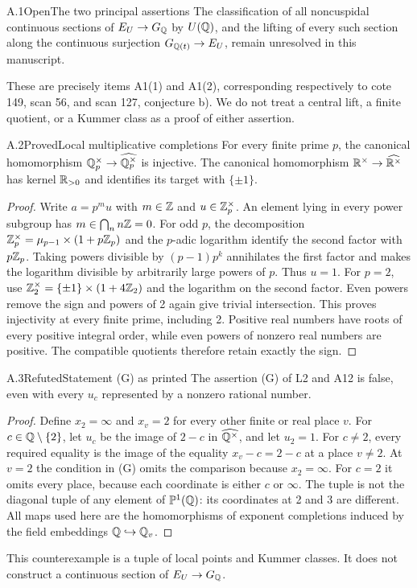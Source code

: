 \begin{statement}{A.1}{Open}{The two principal assertions}
The classification of all noncuspidal continuous sections of $E_U\to G_\mathbb Q$
by $U(\mathbb Q)$, and the lifting of every such section along the continuous
surjection $G_{\mathbb Q(t)}\to E_U$, remain unresolved in this manuscript.
\end{statement}
These are precisely items A1(1) and A1(2), corresponding respectively to
cote 149, scan 56, and scan 127, conjecture b). We do not treat a central
lift, a finite quotient, or a Kummer class as a proof of either assertion.

\begin{statement}{A.2}{Proved}{Local multiplicative completions}
For every finite prime $p$, the canonical homomorphism
$\mathbb Q_p^\times\to\widehat{\mathbb Q_p^\times}$ is injective.
The canonical homomorphism $\mathbb R^\times\to\widehat{\mathbb R^\times}$
has kernel $\mathbb R_{>0}$ and identifies its target with $\{\pm1\}$.
\end{statement}
\begin{proof}
Write $a=p^m u$ with $m\in\mathbb Z$ and $u\in\mathbb Z_p^\times$.
An element lying in every power subgroup has $m\in\bigcap_n n\mathbb Z=0$.
For odd $p$, the decomposition
$\mathbb Z_p^\times=\mu_{p-1}\times(1+p\mathbb Z_p)$ and the $p$-adic logarithm
identify the second factor with $p\mathbb Z_p$. Taking powers divisible by
$(p-1)p^k$ annihilates the first factor and makes the logarithm divisible
by arbitrarily large powers of $p$. Thus $u=1$.
For $p=2$, use $\mathbb Z_2^\times=\{\pm1\}\times(1+4\mathbb Z_2)$ and the
logarithm on the second factor. Even powers remove the sign and powers
of 2 again give trivial intersection. This proves injectivity at every
finite prime, including 2. Positive real numbers have roots of every
positive integral order, while even powers of nonzero real numbers are
positive. The compatible quotients therefore retain exactly the sign.
\end{proof}

\begin{statement}{A.3}{Refuted}{Statement (G) as printed}
The assertion (G) of L2 and A12 is false, even with every $u_c$ represented
by a nonzero rational number.
\end{statement}
\begin{proof}
Define $x_2=\infty$ and $x_v=2$ for every other finite or real place $v$.
For $c\in\mathbb Q\setminus\{2\}$, let $u_c$ be the image of $2-c$ in
$\widehat{\mathbb Q^\times}$, and let $u_2=1$.
For $c\ne2$, every required equality is the image of the equality
$x_v-c=2-c$ at a place $v\ne2$. At $v=2$ the condition in (G) omits
the comparison because $x_2=\infty$. For $c=2$ it omits every place,
because each coordinate is either $c$ or $\infty$.
The tuple is not the diagonal tuple of any element of $\mathbb P^1(\mathbb Q)$:
its coordinates at 2 and 3 are different. All maps used here are the
homomorphisms of exponent completions induced by the field embeddings
$\mathbb Q\hookrightarrow\mathbb Q_v$.
\end{proof}
This counterexample is a tuple of local points and Kummer classes. It
does not construct a continuous section of $E_U\to G_\mathbb Q$.

